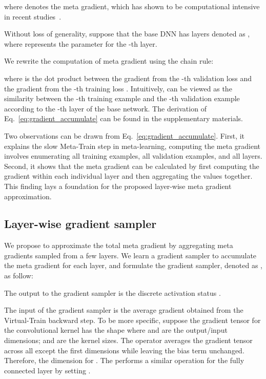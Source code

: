 \documentclass[final]{cvpr}
\begin{document}
where  denotes the meta gradient, which has shown to be computational intensive in recent studies~\cite{ren2018learning, shu2019meta, wang2020training}. 



Without loss of generality, suppose that the base DNN has  layers denoted as , where  represents the parameter for the -th layer.

We rewrite the computation of meta gradient using the chain rule:

where  is the dot product between 
the gradient from the -th validation loss \wrt 
and the gradient from the -th training loss \wrt .
Intuitively,  can be viewed as the similarity between the -th training example and the -th validation example according to the -th layer of the base network. 
The derivation of Eq.~\eqref{eq:gradient_accumulate} can be found in the supplementary materials.


Two observations can be drawn from Eq.~\eqref{eq:gradient_accumulate}. First, it explains the slow Meta-Train step in meta-learning, \ie computing the meta gradient involves enumerating all training examples, all validation examples, and all layers. Second, it shows that the meta gradient can be calculated by first computing the gradient  within each individual layer and then aggregating the values together. This finding lays a foundation for the proposed layer-wise meta gradient approximation.



\subsection{Layer-wise gradient sampler}\label{sec:LGSM}

We propose to approximate the total meta gradient by aggregating meta gradients sampled from a few layers. We learn a gradient sampler to accumulate the meta gradient for each layer, and formulate the gradient sampler, denoted as , as follow:

The output to the gradient sampler is the discrete activation status .

The input of the gradient sampler is the average gradient  obtained from the Virtual-Train backward step.
To be more specific, suppose the gradient tensor for the convolutional kernel has the shape  where  and  are the output/input dimensions;  and  are the kernel sizes. The  operator averages the gradient tensor across all except the first dimensions while leaving the bias term unchanged. Therefore, the dimension for .
The  performs a similar operation for the fully connected layer by setting .
\end{document}
